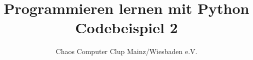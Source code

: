 



	\title{Programmieren lernen mit Python\\Codebeispiel 2}
	\author{Chaos Computer Clup Mainz/Wiesbaden e.V.}
	\maketitle
	
	\section*{}
	
	\lstset{numbers=left}
	
	
